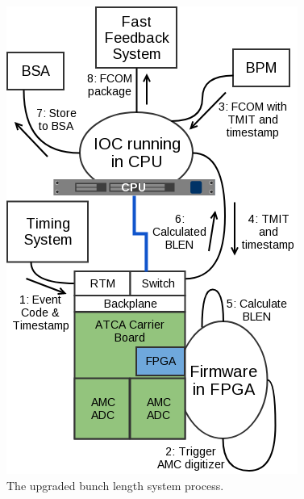 \documentclass[letter,
               biblatex,     %
               keeplastbox,   %
               ]{jacow}
\begin{document}
\begin{figure}[!htb]
   \centering
   \includegraphics*[width=\columnwidth]{BLEN_ATCA_Process}
   \caption{The upgraded bunch length system process.}
   \label{fig:blen_atca}
\end{figure}
\end{document}
